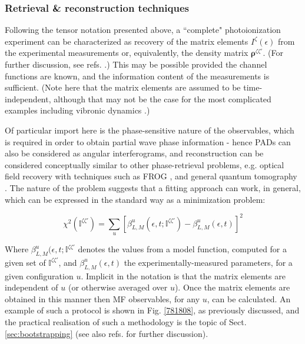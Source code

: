\subsubsection{Retrieval \& reconstruction techniques}


Following the tensor notation presented above, a ``complete" photoionization experiment can be characterized as recovery of the matrix elements $I^{\zeta}(\epsilon)$ from the experimental measurements or, equivalently, the density matrix $\mathbf{\rho}^{\zeta\zeta'}$. (For further discussion, see refs. \cite{Reid2003,kleinpoppen2013perfect,hockett2018QMP1}.) This may be possible provided the channel functions are known, and the information content of the measurements is sufficient. (Note here that the matrix elements are assumed to be time-independent, although that may not be the case for the most complicated examples including vibronic dynamics \cite{hockett2018QMP2}.) 

Of particular import here is the phase-sensitive nature of the observables, which is required in order to obtain partial wave phase information - hence PADs can also be considered as angular interferograms, and reconstruction can be considered conceptually similar to other phase-retrieval problems, e.g. optical field recovery with techniques such as FROG \cite{trebino2000FrequencyResolvedOpticalGating}, and general quantum tomography \cite{MauroDAriano2003}. The nature of the problem suggests that a fitting approach can work, in general, which can be expressed in the standard way as a minimization problem:

\begin{equation}
\chi^{2}(\mathbb{I}^{\zeta\zeta'})=\sum_{u}\left[\beta^{u}_{L,M}(\epsilon,t;\mathbb{I}^{\zeta\zeta'})-\beta^{u}_{L,M}(\epsilon,t)\right]^{2}\label{eq:chi2-I}
\end{equation}

Where $\beta^{u}_{L,M}(\epsilon,t;\mathbb{I}^{\zeta\zeta'}$ denotes  the values from a model function, computed for a given set of $\mathbb{I}^{\zeta\zeta'}$, and $\beta^{u}_{L,M}(\epsilon,t)$ the experimentally-measured parameters, for a given configuration $u$. Implicit in the notation is that the matrix elements are independent of $u$ (or otherwise averaged over $u$). Once the matrix elements are obtained in this manner then MF observables, for any $u$, can be calculated. An example of such a protocol is shown in Fig. \ref{781808}, as previously discussed, and the practical realisation of such a methodology is the topic of Sect. \ref{sec:bootstrapping} (see also refs. \cite{hockett2018QMP2, marceau2017MolecularFrameReconstruction} for further discussion).

